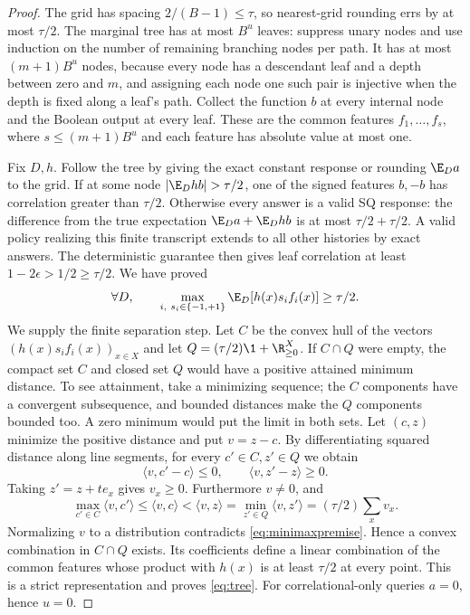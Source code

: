 \begin{proof}
The grid has spacing $2/(B-1)\leq\tau$, so nearest-grid rounding errs by at most $\tau/2$. The marginal tree has at most $B^u$ leaves: suppress unary nodes and use induction on the number of remaining branching nodes per path. It has at most $(m+1)B^u$ nodes, because every node has a descendant leaf and a depth between zero and $m$, and assigning each node one such pair is injective when the depth is fixed along a leaf's path.
Collect the function $b$ at every internal node and the Boolean output at every leaf. These are the common features $f_1,\ldots,f_s$, where $s\leq(m+1)B^u$ and each feature has absolute value at most one.

Fix $D,h$. Follow the tree by giving the exact constant response or rounding $\E_Da$ to the grid. If at some node $|\E_D hb|>\tau/2$, one of the signed features $b,-b$ has correlation greater than $\tau/2$. Otherwise every answer is a valid SQ response: the difference from the true expectation $\E_Da+\E_D hb$ is at most $\tau/2+\tau/2$. A valid policy realizing this finite transcript extends to all other histories by exact answers. The deterministic guarantee then gives leaf correlation at least $1-2\epsilon>1/2\geq\tau/2$. We have proved
\begin{equation}\label{eq:minimaxpremise}
 \forall D,\qquad \max_{i,\ s_i\in\{-1,+1\}}\E_D[h(x)s_if_i(x)]\geq\tau/2.
\end{equation}
We supply the finite separation step. Let $C$ be the convex hull of the vectors $(h(x)s_if_i(x))_{x\in X}$ and let $Q=(\tau/2)\1+\R_{\geq0}^X$. If $C\cap Q$ were empty, the compact set $C$ and closed set $Q$ would have a positive attained minimum distance. To see attainment, take a minimizing sequence; the $C$ components have a convergent subsequence, and bounded distances make the $Q$ components bounded too. A zero minimum would put the limit in both sets. Let $(c,z)$ minimize the positive distance and put $v=z-c$. By differentiating squared distance along line segments, for every $c'\in C,z'\in Q$ we obtain
\[
 \langle v,c'-c\rangle\leq0,\qquad
 \langle v,z'-z\rangle\geq0.
\]
Taking $z'=z+te_x$ gives $v_x\geq0$. Furthermore $v\ne0$, and
\[
 \max_{c'\in C}\langle v,c'\rangle
 \leq\langle v,c\rangle<\langle v,z\rangle
 =\min_{z'\in Q}\langle v,z'\rangle=(\tau/2)\sum_xv_x.
\]
Normalizing $v$ to a distribution contradicts \eqref{eq:minimaxpremise}. Hence a convex combination in $C\cap Q$ exists. Its coefficients define a linear combination of the common features whose product with $h(x)$ is at least $\tau/2$ at every point. This is a strict representation and proves \eqref{eq:tree}. For correlational-only queries $a=0$, hence $u=0$.


\end{proof}
